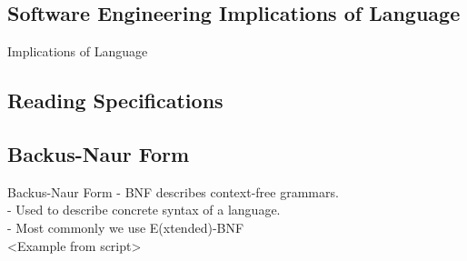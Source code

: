 \subsection{Software Engineering Implications of Language}
\begin{frame}{Implications of Language}

\end{frame}

\subsection{Reading Specifications}
\subsection*{Backus-Naur Form}
\begin{frame}{Backus-Naur Form}
    - BNF describes context-free grammars.\\
    - Used to describe concrete syntax of a language.\\
    - Most commonly we use E(xtended)-BNF\\
    <Example from script>
\end{frame}
